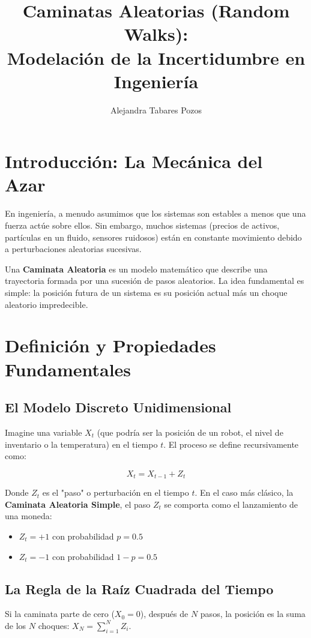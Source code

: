 \documentclass[11pt, letterpaper]{article}
\title{Caminatas Aleatorias (Random Walks): \\ Modelación de la Incertidumbre en Ingeniería}
\author{Alejandra Tabares Pozos}
\date{}
\begin{document}
\maketitle
\tableofcontents
\newpage

\section{Introducción: La Mecánica del Azar}

En ingeniería, a menudo asumimos que los sistemas son estables a menos que una fuerza actúe sobre ellos. Sin embargo, muchos sistemas (precios de activos, partículas en un fluido, sensores ruidosos) están en constante movimiento debido a perturbaciones aleatorias sucesivas.

Una \textbf{Caminata Aleatoria} es un modelo matemático que describe una trayectoria formada por una sucesión de pasos aleatorios. La idea fundamental es simple: la posición futura de un sistema es su posición actual más un choque aleatorio impredecible.

\section{Definición y Propiedades Fundamentales}

\subsection{El Modelo Discreto Unidimensional}
Imagine una variable $X_t$ (que podría ser la posición de un robot, el nivel de inventario o la temperatura) en el tiempo $t$. El proceso se define recursivamente como:

\begin{equation}
    X_t = X_{t-1} + Z_t
\end{equation}

Donde $Z_t$ es el "paso" o perturbación en el tiempo $t$.
En el caso más clásico, la \textbf{Caminata Aleatoria Simple}, el paso $Z_t$ se comporta como el lanzamiento de una moneda:
\begin{itemize}
    \item $Z_t = +1$ con probabilidad $p = 0.5$
    \item $Z_t = -1$ con probabilidad $1-p = 0.5$
\end{itemize}

\subsection{La Regla de la Raíz Cuadrada del Tiempo}
Si la caminata parte de cero ($X_0 = 0$), después de $N$ pasos, la posición es la suma de los $N$ choques: $X_N = \sum_{i=1}^{N} Z_i$.
\end{document}
